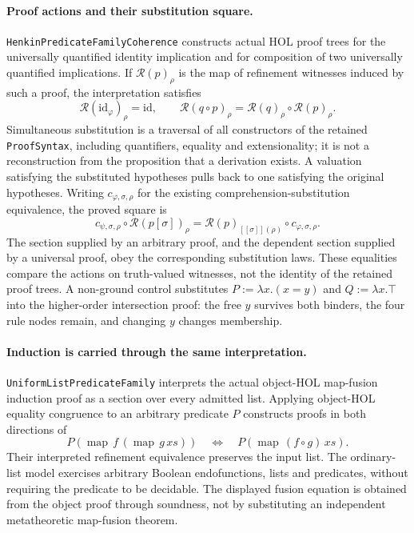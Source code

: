 \documentclass[11pt]{article}
\theoremstyle{definition}
\theoremstyle{remark}
\newcommand{\sem}[1]{[\![#1]\!]}
\begin{document}
\paragraph{Proof actions and their substitution square.}
\nolinkurl{HenkinPredicateFamilyCoherence} constructs actual HOL proof trees
for the universally quantified identity implication and for composition of
two universally quantified implications. If $\mathcal R(p)_\rho$ is the
map of refinement witnesses induced by such a proof, the interpretation
satisfies
\[
 \mathcal R(\mathrm{id}_\varphi)_\rho=\mathrm{id},
 \qquad
 \mathcal R(q\circ p)_\rho
      =\mathcal R(q)_\rho\circ\mathcal R(p)_\rho.
\]
Simultaneous substitution is a traversal of all constructors of the retained
\nolinkurl{ProofSyntax}, including quantifiers, equality and extensionality;
it is not a reconstruction from the proposition that a derivation exists.
A valuation satisfying the substituted hypotheses pulls back to one
satisfying the original hypotheses. Writing $c_{\varphi,\sigma,\rho}$ for
the existing comprehension-substitution equivalence, the proved square is
\[
 c_{\psi,\sigma,\rho}\circ\mathcal R(p[\sigma])_\rho
   =\mathcal R(p)_{\sem\sigma(\rho)}\circ c_{\varphi,\sigma,\rho}.
\]
The section supplied by an arbitrary proof, and the dependent section
supplied by a universal proof, obey the corresponding substitution laws.
These equalities compare the actions on truth-valued witnesses, not the
identity of the retained proof trees. A non-ground control substitutes
$P:=\lambda x.(x=y)$ and $Q:=\lambda x.\top$ into the higher-order
intersection proof: the free $y$ survives both binders, the four rule nodes
remain, and changing $y$ changes membership.

\paragraph{Induction is carried through the same interpretation.}
\nolinkurl{UniformListPredicateFamily} interprets the actual object-HOL
map-fusion induction proof as a section over every admitted list. Applying
object-HOL equality congruence to an arbitrary predicate $P$ constructs
proofs in both directions of
\[
  P(\operatorname{map}\,f\,(\operatorname{map}\,g\,xs))
  \quad\Longleftrightarrow\quad
  P(\operatorname{map}\,(f\circ g)\,xs).
\]
Their interpreted refinement equivalence preserves the input list. The
ordinary-list model exercises arbitrary Boolean endofunctions, lists and
predicates, without requiring the predicate to be decidable. The displayed
fusion equation is obtained from the object proof through soundness, not
by substituting an independent metatheoretic map-fusion theorem.
\end{document}
